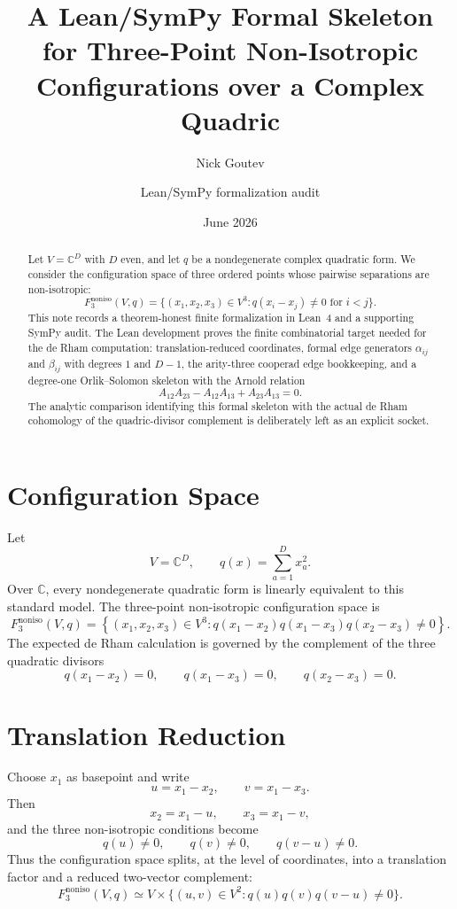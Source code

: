 \documentclass[11pt]{article}
\title{A Lean/SymPy Formal Skeleton for Three-Point Non-Isotropic Configurations over a Complex Quadric}
\author{Nick Goutev \and Lean/SymPy formalization audit}
\date{June 2026}
\begin{document}
\maketitle

\begin{abstract}
Let $V=\mathbb C^D$ with $D$ even, and let $q$ be a nondegenerate complex quadratic form.  We consider the configuration space of three ordered points whose pairwise separations are non-isotropic:
\[
F_3^{\mathrm{noniso}}(V,q)=
\{(x_1,x_2,x_3)\in V^3: q(x_i-x_j)\neq 0\text{ for }i<j\}.
\]
This note records a theorem-honest finite formalization in Lean~4 and a supporting SymPy audit.  The Lean development proves the finite combinatorial target needed for the de Rham computation: translation-reduced coordinates, formal edge generators $\alpha_{ij}$ and $\beta_{ij}$ with degrees $1$ and $D-1$, the arity-three cooperad edge bookkeeping, and a degree-one Orlik--Solomon skeleton with the Arnold relation
\[
A_{12}A_{23}-A_{12}A_{13}+A_{23}A_{13}=0.
\]
The analytic comparison identifying this formal skeleton with the actual de Rham cohomology of the quadric-divisor complement is deliberately left as an explicit socket.
\end{abstract}

\section{Configuration Space}
Let
\[
V=\mathbb C^D,
\qquad
q(x)=\sum_{a=1}^D x_a^2.
\]
Over $\mathbb C$, every nondegenerate quadratic form is linearly equivalent to this standard model.  The three-point non-isotropic configuration space is
\[
F_3^{\mathrm{noniso}}(V,q)=
\left\{(x_1,x_2,x_3)\in V^3:
q(x_1-x_2)q(x_1-x_3)q(x_2-x_3)\neq 0
\right\}.
\]
The expected de Rham calculation is governed by the complement of the three quadratic divisors
\[
q(x_1-x_2)=0,
\qquad
q(x_1-x_3)=0,
\qquad
q(x_2-x_3)=0.
\]

\section{Translation Reduction}
Choose $x_1$ as basepoint and write
\[
u=x_1-x_2,
\qquad
v=x_1-x_3.
\]
Then
\[
x_2=x_1-u,
\qquad
x_3=x_1-v,
\]
and the three non-isotropic conditions become
\[
q(u)\neq 0,
\qquad
q(v)\neq 0,
\qquad
q(v-u)\neq 0.
\]
Thus the configuration space splits, at the level of coordinates, into a translation factor and a reduced two-vector complement:
\[
F_3^{\mathrm{noniso}}(V,q)
\simeq
V\times
\{(u,v)\in V^2:q(u)q(v)q(v-u)\neq 0\}.
\]
\end{document}
